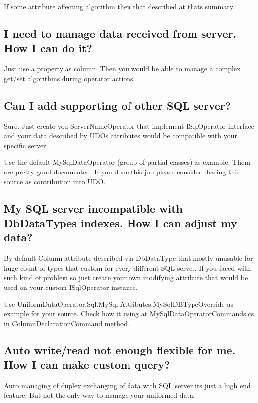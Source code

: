 If some attribute affecting algorithm then that described at that\textquotesingle{}s summary.

\subsection*{I need to manage data received from server. How I can do it?}

Just use a property as column. Then you would be able to manage a complex get/set algorithms during operator actions.

\subsection*{Can I add supporting of other S\+QL server?}

Sure. Just create you Server\+Name\+Operator that implement I\+Sql\+Operator interface and your data described by U\+DO\textquotesingle{}s attributes would be compatible with your specific server.

Use the default My\+Sql\+Data\+Operator (group of partial classes) as example. Them are pretty good documented. If you done this job please consider sharing this source as contribution into U\+DO.

\subsection*{My S\+QL server incompatible with Db\+Data\+Type\textquotesingle{}s indexes. How I can adjust my data?}

By default {\ttfamily Column} attribute described via {\ttfamily Db\+Data\+Type} that mostly unusable for huge count of types that custom for every different S\+QL server. If you faced with such kind of problem so just create your own modifying attribute that would be used on your custom {\ttfamily I\+Sql\+Operator} instance.

Use {\ttfamily Uniform\+Data\+Operator.\+Sql.\+My\+Sql.\+Attributes.\+My\+Sql\+D\+B\+Type\+Override} as example for your source. Check how it using at {\ttfamily My\+Sql\+Data\+Operator\+Commands.\+cs} in {\ttfamily Column\+Declaration\+Command} method.

\subsection*{Auto write/read not enough flexible for me. How I can make custom query?}

Auto managing of duplex exchanging of data with S\+QL server it\textquotesingle{}s just a high end feature. But not the only way to manage your uniformed data.

